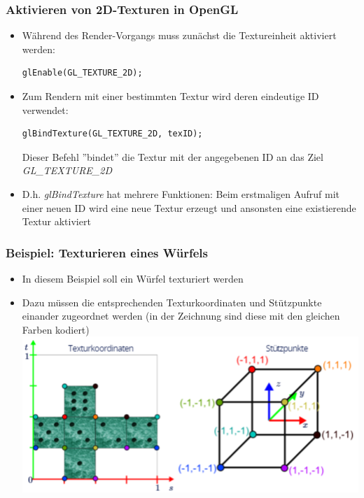 \documentclass{scrartcl}
\begin{document}
\subsubsection{Aktivieren von 2D-Texturen in OpenGL}

\begin{itemize}
	\item Während des Render-Vorgangs muss zunächst die Textureinheit aktiviert werden:
	\begin{lstlisting}
glEnable(GL_TEXTURE_2D);
	\end{lstlisting}
	\item Zum Rendern mit einer bestimmten Textur wird deren eindeutige ID verwendet:
	\begin{lstlisting}
glBindTexture(GL_TEXTURE_2D, texID);
	\end{lstlisting}
	Dieser Befehl ''bindet'' die Textur mit der angegebenen ID an das Ziel \textit{GL\_TEXTURE\_2D}
	\item D.h. \textit{glBindTexture} hat mehrere Funktionen: Beim erstmaligen Aufruf mit einer neuen ID wird eine neue Textur erzeugt und ansonsten eine existierende Textur aktiviert
\end{itemize}

\subsubsection{Beispiel: Texturieren eines Würfels}

\begin{itemize}
	\item In diesem Beispiel soll ein Würfel texturiert werden
	\item Dazu müssen die entsprechenden Texturkoordinaten und Stützpunkte einander zugeordnet werden (in der Zeichnung sind diese mit den gleichen Farben kodiert) \\
	\includegraphics[scale=0.5]{figures/texture_dice.png}
\end{itemize}
\end{document}
